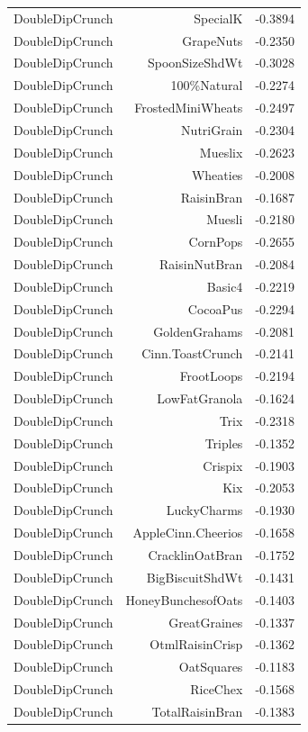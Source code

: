 \begin{longtable}{@{}lrr@{}}
DoubleDipCrunch & SpecialK & -0.3894 \\
DoubleDipCrunch & GrapeNuts & -0.2350 \\
DoubleDipCrunch & SpoonSizeShdWt & -0.3028 \\
DoubleDipCrunch & 100\%Natural & -0.2274 \\
DoubleDipCrunch & FrostedMiniWheats & -0.2497 \\
DoubleDipCrunch & NutriGrain & -0.2304 \\
DoubleDipCrunch & Mueslix & -0.2623 \\
DoubleDipCrunch & Wheaties & -0.2008 \\
DoubleDipCrunch & RaisinBran & -0.1687 \\
DoubleDipCrunch & Muesli & -0.2180 \\
DoubleDipCrunch & CornPops & -0.2655 \\
DoubleDipCrunch & RaisinNutBran & -0.2084 \\
DoubleDipCrunch & Basic4 & -0.2219 \\
DoubleDipCrunch & CocoaPus & -0.2294 \\
DoubleDipCrunch & GoldenGrahams & -0.2081 \\
DoubleDipCrunch & Cinn.ToastCrunch & -0.2141 \\
DoubleDipCrunch & FrootLoops & -0.2194 \\
DoubleDipCrunch & LowFatGranola & -0.1624 \\
DoubleDipCrunch & Trix & -0.2318 \\
DoubleDipCrunch & Triples & -0.1352 \\
DoubleDipCrunch & Crispix & -0.1903 \\
DoubleDipCrunch & Kix & -0.2053 \\
DoubleDipCrunch & LuckyCharms & -0.1930 \\
DoubleDipCrunch & AppleCinn.Cheerios & -0.1658 \\
DoubleDipCrunch & CracklinOatBran & -0.1752 \\
DoubleDipCrunch & BigBiscuitShdWt & -0.1431 \\
DoubleDipCrunch & HoneyBunchesofOats & -0.1403 \\
DoubleDipCrunch & GreatGraines & -0.1337 \\
DoubleDipCrunch & OtmlRaisinCrisp & -0.1362 \\
DoubleDipCrunch & OatSquares & -0.1183 \\
DoubleDipCrunch & RiceChex & -0.1568 \\
DoubleDipCrunch & TotalRaisinBran & -0.1383 \\

\end{longtable}
